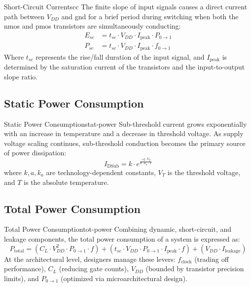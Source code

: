 \begin{definition}{Short-Circuit Current}{scc}
    The finite slope of input signals causes a direct current path between \(V_{DD}\) and \gls{gnd} for a brief period during switching when both the \gls{nmos} and \gls{pmos} transistors are simultaneously conducting:
    \begin{align*}
        E_{sc} &= t_{sc} \cdot V_{DD} \cdot I_{\text{peak}} \cdot P_{0\rightarrow 1}\\
        P_{sc} &= t_{sc} \cdot V_{DD} \cdot I_{\text{peak}} \cdot f_{0\rightarrow 1}
    \end{align*}
    Where \(t_{sc}\) represents the rise/fall duration of the input signal, and \(I_{\text{peak}}\) is determined by the saturation current of the transistors and the input-to-output slope ratio.
\end{definition}

\subsection{Static Power Consumption}
\begin{definition}{Static Power Consumption}{stat-power}
    Sub-threshold current grows exponentially with an increase in temperature and a decrease in threshold voltage. As supply voltage scaling continues, sub-threshold conduction becomes the primary source of power dissipation:
    \[
        I_{\text{DSub}} = k \cdot e^{\frac{-q \cdot V_{T}}{a \cdot k_a \cdot T}}
    \]
    where \(k, a, k_a\) are technology-dependent constants, \(V_T\) is the threshold voltage, and \(T\) is the absolute temperature.
\end{definition}

\subsection{Total Power Consumption}
\begin{definition}{Total Power Consumption}{tot-power}
    Combining dynamic, short-circuit, and leakage components, the total power consumption of a system is expressed as:
    \[
        P_{\text{total}} = \left(C_{L} \cdot V^2_{DD} \cdot P_{0\rightarrow1} \cdot f\right) + \left(t_{sc} \cdot V_{DD} \cdot P_{0\rightarrow1} \cdot I_{\text{peak}} \cdot f\right) + \left(V_{DD} \cdot I_{\text{leakage}}\right)
    \]
    At the architectural level, designers manage these levers: \(f_{\text{clock}}\) (trading off performance), \(C_L\) (reducing gate counts), \(V_{DD}\) (bounded by transistor precision limits), and \(P_{0\rightarrow1}\) (optimized via microarchitectural design).
\end{definition}

